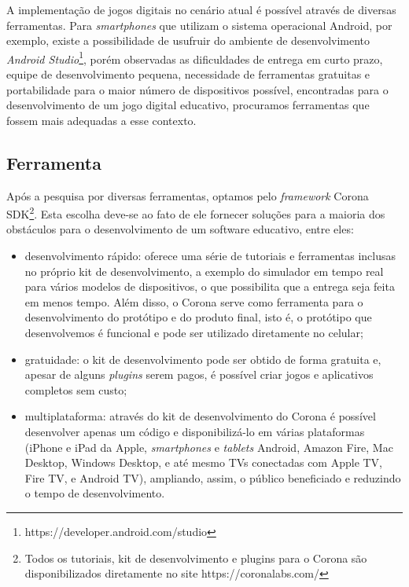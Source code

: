 A implementação de jogos digitais no cenário atual é possível através de diversas ferramentas. Para \textit{smartphones} que utilizam o sistema operacional Android, por exemplo, existe a possibilidade de usufruir do ambiente de desenvolvimento \textit{Android Studio}\footnote{https://developer.android.com/studio}, porém observadas as dificuldades de entrega em curto prazo, equipe de desenvolvimento pequena, necessidade de ferramentas gratuitas e portabilidade para o maior número de dispositivos possível, encontradas para o desenvolvimento de um jogo digital educativo, procuramos ferramentas que fossem mais adequadas a esse contexto.

\subsection{Ferramenta} \label{ssec:ferramenta}

Após a pesquisa por diversas ferramentas, optamos pelo \textit{framework} Corona SDK\footnote{Todos os tutoriais, kit de desenvolvimento e plugins para o Corona são disponibilizados diretamente no site https://coronalabs.com/}. Esta escolha deve-se ao fato de ele fornecer soluções para a maioria dos obstáculos para o desenvolvimento de um software educativo, entre eles:

\begin{itemize}
	\item desenvolvimento rápido: oferece uma série de tutoriais e ferramentas inclusas no próprio kit de desenvolvimento, a exemplo do simulador em tempo real para vários modelos de dispositivos, o que possibilita que a entrega seja feita em menos tempo. Além disso, o Corona serve como ferramenta para o desenvolvimento do protótipo e do produto final, isto é, o protótipo que desenvolvemos é funcional e pode ser utilizado diretamente no celular;
	\item gratuidade: o kit de desenvolvimento pode ser obtido de forma gratuita e, apesar de alguns \textit{plugins} serem pagos, é possível criar jogos e aplicativos completos sem custo;
	\item multiplataforma: através do kit de desenvolvimento do Corona é possível desenvolver apenas um código e disponibilizá-lo em várias plataformas (iPhone e iPad da Apple, \textit{smartphones} e \textit{tablets} Android, Amazon Fire, Mac Desktop, Windows Desktop, e até mesmo TVs conectadas com Apple TV, Fire TV, e Android TV), ampliando, assim, o público beneficiado e reduzindo o tempo de desenvolvimento.
\end{itemize}

